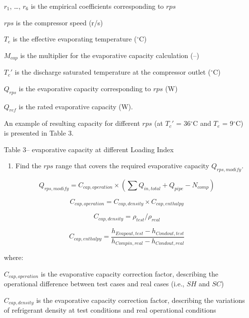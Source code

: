 \(r_1\), \ldots{}, \(r_6\) is the empirical coefficients corresponding to \(rps\)

\(rps\) is the compressor speed (r/s)

\(T_e\) is the effective evaporating temperature (\(^{\circ}\)C)

\(M_{cap}\) is the multiplier for the evaporative capacity calculation (--)

\({T_c}'\) is the discharge saturated temperature at the compressor outlet (\(^{\circ}\)C)

\(Q_{rps}\) is the evaporative capacity corresponding to \(rps\) (W)

\(Q_{ref}\) is the rated evaporative capacity (W).

An example of resulting capacity for different \(rps\) (at \({T_c}'\) = 36\(^{\circ}\)C and \(T_e\) = 9\(^{\circ}\)C) is presented in Table 3.

Table 3-- evaporative capacity at different Loading Index

\begin{enumerate}
\def\labelenumi{\alph{enumi}.}
\setcounter{enumi}{1}
\tightlist
\item
  Find the \(rps\) range that covers the required evaporative capacity \(Q_{rps,modify}\).
\end{enumerate}

\begin{equation}
Q_{rps,modify} = C_{cap,operation}\times(\sum{Q_{in,total}}+Q_{pipe}-N_{comp})
\end{equation}

\begin{equation}
C_{cap,operation} = C_{cap,density}\times{C_{cap,enthalpy}}
\end{equation}

\begin{equation}
C_{cap,density} = \rho_{test}/\rho_{real}
\end{equation}

\begin{equation}
C_{cap,enthalpy} = \frac{h_{Evapout,test}-h_{Condout,test}}{h_{Compin,real}-h_{Condout,real}}
\end{equation}

where:

\(C_{cap,operation}\) is the evaporative capacity correction factor, describing the operational difference between test cases and real cases (i.e., \(SH\) and \(SC\))

\(C_{cap,density}\) is the evaporative capacity correction factor, describing the variations of refrigerant density at test conditions and real operational conditions

